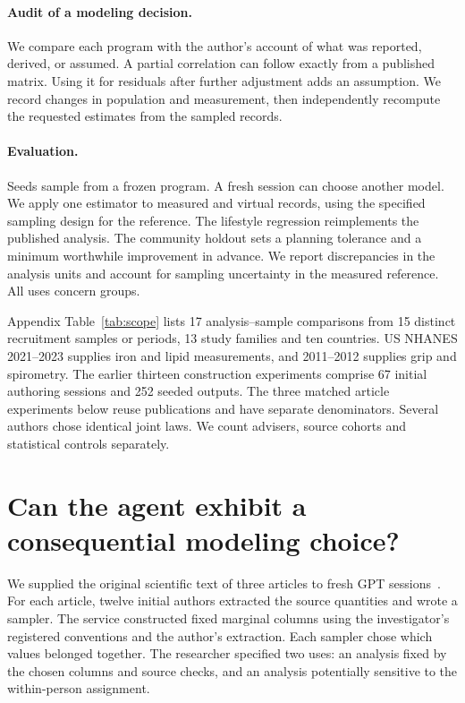 \documentclass[sigconf,anonymous,review]{acmart}
\begin{document}
\paragraph{Audit of a modeling decision.}
We compare each program with the author's account of what was reported, derived, or assumed. A partial correlation can follow exactly from a published matrix. Using it for residuals after further adjustment adds an assumption. We record changes in population and measurement, then independently recompute the requested estimates from the sampled records.

\paragraph{Evaluation.}
Seeds sample from a frozen program. A fresh session can choose another model. We apply one estimator to measured and virtual records, using the specified sampling design for the reference. The lifestyle regression reimplements the published analysis. The community holdout sets a planning tolerance and a minimum worthwhile improvement in advance. We report discrepancies in the analysis units and account for sampling uncertainty in the measured reference. All uses concern groups.

Appendix Table~\ref{tab:scope} lists 17 analysis--sample comparisons from 15 distinct recruitment samples or periods, 13 study families and ten countries. US NHANES 2021--2023 supplies iron and lipid measurements, and 2011--2012 supplies grip and spirometry. The earlier thirteen construction experiments comprise 67 initial authoring sessions and 252 seeded outputs. The three matched article experiments below reuse publications and have separate denominators. Several authors chose identical joint laws. We count advisers, source cohorts and statistical controls separately.

\section{Can the agent exhibit a consequential modeling choice?}
\label{sec:matched}
We supplied the original scientific text of three articles to fresh GPT sessions~\cite{kavishe,polishspi,zhu}. For each article, twelve initial authors extracted the source quantities and wrote a sampler. The service constructed fixed marginal columns using the investigator's registered conventions and the author's extraction. Each sampler chose which values belonged together. The researcher specified two uses: an analysis fixed by the chosen columns and source checks, and an analysis potentially sensitive to the within-person assignment.
\end{document}
